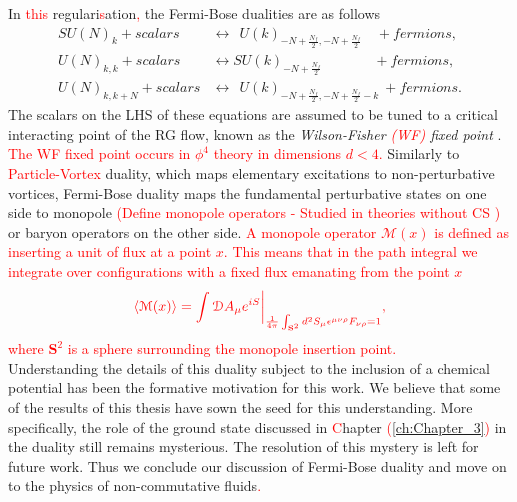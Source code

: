         \indent In \textcolor{red}{this} regulari\textcolor{red}{s}ation\textcolor{red}{,} the Fermi-Bose dualities are as follows \cite{Aharony:2015mjs} 
            \begin{align}
                SU(N)_k + scalars &\longleftrightarrow \ \ U(k)_{-N +\frac{N_f}{2}, -N + \frac{N_f}{2}} \quad + fermions, \label{eq:Fermi-Bose_1} \\
                U(N)_{k,k} + scalars &\longleftrightarrow SU(k)_{-N +\frac{N_f}{2}}\qquad \ \ \ \quad+ fermions,  \label{eq:Fermi-Bose_2}\\
                U(N)_{k,k+N} + scalars &\longleftrightarrow \ \ U(k)_{-N +\frac{N_f}{2}, -N + \frac{N_f}{2}-k} \ + fermions.  \label{eq:Fermi-Bose_3}
            \end{align}
            The scalars on the LHS of these equations are assumed to be tuned to a critical interacting point of the RG flow, known as the \textit{Wilson-Fisher \textcolor{red}{(WF)} fixed point} \cite{Wilson:1971dc}. \textcolor{red}{The WF fixed point occurs in $\phi^4$ theory in dimensions $d<4$.} Similarly to \textcolor{red}{Particle-Vortex} duality, which maps elementary excitations to non-perturbative vortices, Fermi-Bose duality maps the fundamental perturbative states on one side to monopole \textcolor{red}{(Define monopole operators - Studied in theories without CS \cite{Borokhov:2002ib, Borokhov:2002cg, Pufu:2013eda, Pufu:2013vpa})}  or baryon operators on the other side. \textcolor{red}{A monopole operator $\mathcal{M}(x)$ is defined as inserting a unit of flux at a point $x$. This means that in the path integral we integrate over configurations with a fixed flux emanating from the point $x$} \\
\begin{align}
    \textcolor{red}{ \langle \mathcal{M}(x) \rangle = \int \mathcal{D}A_{\mu} e^{i S}\bigg |_{\frac{1}{4\pi} \int_{\textbf{S}^2} d^2S_{\mu} \epsilon^{\mu \nu \rho}F_{\nu \rho} =1}, }
\end{align}
    \textcolor{red}{where $\mathbf{S}^2$ is a sphere surrounding the monopole insertion point.} \\
            \indent Understanding the details of this duality subject to the inclusion of a chemical potential has been the formative motivation for this work. We believe that some of the results of this thesis have sown the seed for this understanding. More specifically, the role of the ground state discussed in \textcolor{red}{C}hapter \textcolor{red}{(\ref{ch:Chapter_3})} in the duality still remains mysterious. The resolution of this mystery is left for future work. Thus we conclude our discussion of Fermi-Bose duality and move on to the physics of non-commutative fluids\textcolor{red}{.}
%
